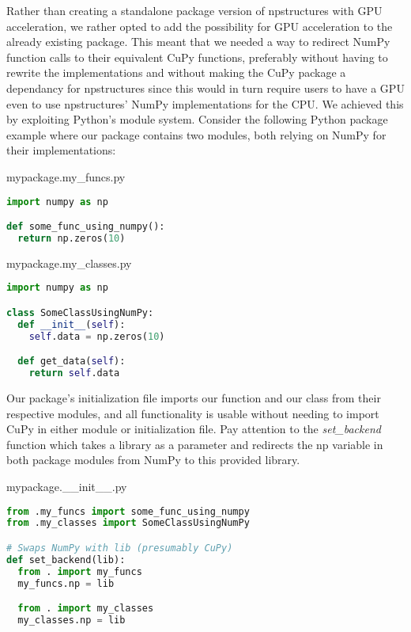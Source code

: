 Rather than creating a standalone package version of npstructures with GPU acceleration, we rather opted to add the possibility for GPU acceleration to the already existing package.
This meant that we needed a way to redirect NumPy function calls to their equivalent CuPy functions, preferably without having to rewrite the implementations and without making the CuPy package a dependancy for npstructures since this would in turn require users to have a GPU even to use npstructures' NumPy implementations for the CPU.
We achieved this by exploiting Python's module system.
Consider the following Python package example where our package contains two modules, both relying on NumPy for their implementations:
\begin{center}
mypackage.my\_funcs.py
\end{center}
\begin{lstlisting}[language=Python,style=pycode]
import numpy as np

def some_func_using_numpy():
  return np.zeros(10)
\end{lstlisting}

\begin{center}
mypackage.my\_classes.py
\end{center}
\begin{lstlisting}[language=Python,style=pycode]
import numpy as np

class SomeClassUsingNumPy:
  def __init__(self):
    self.data = np.zeros(10)

  def get_data(self):
    return self.data
\end{lstlisting}

Our package's initialization file imports our function and our class from their respective modules, and all functionality is usable without needing to import CuPy in either module or initialization file.
Pay attention to the \textit{set\_backend} function which takes a library as a parameter and redirects the np variable in both package modules from NumPy to this provided library.

\begin{center}
mypackage.\_\_init\_\_.py
\end{center}
\begin{lstlisting}[language=Python,style=pycode]
from .my_funcs import some_func_using_numpy
from .my_classes import SomeClassUsingNumPy 

# Swaps NumPy with lib (presumably CuPy)
def set_backend(lib):
  from . import my_funcs
  my_funcs.np = lib

  from . import my_classes
  my_classes.np = lib
\end{lstlisting}

